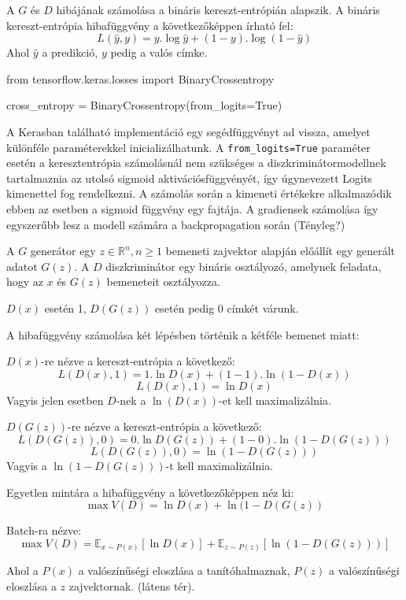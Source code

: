 
A $G$ és $D$ hibájának számolása a bináris kereszt-entrópián alapszik.
A bináris kereszt-entrópia hibafüggvény a következőképpen írható fel:
$$L(\hat y, y) = y . \log \hat y + (1-y). \log (1 - \hat y)$$
Ahol $\hat y$ a predikció, $y$ pedig a valós címke.

\begin{python}
from tensorflow.keras.losses import BinaryCrossentropy

cross_entropy = BinaryCrossentropy(from_logits=True)
\end{python}


A Kerasban található implementáció egy segédfüggvényt ad vissza, amelyet különféle paraméterekkel inicializálhatunk. A \texttt{from\_logits=True} paraméter esetén a keresztentrópia számolásnál nem szükséges a diszkriminátormodellnek tartalmaznia az utolsó sigmoid aktivációsfüggvényét, így úgynevezett Logits kimenettel fog rendelkezni. A számolás során a kimeneti értékekre alkalmazódik ebben az esetben a sigmoid függvény egy fajtája. A gradiensek számolása így egyszerűbb lesz a modell számára a backpropagation során (Tényleg?)


A $G$ generátor egy $z \in \mathbb{R}^n, n \geq 1$ bemeneti zajvektor alapján előállít egy generált adatot $G(z)$.
A $D$ diszkriminátor egy bináris osztályozó, amelynek feladata, hogy az $x$ és $G(z)$ bemeneteit osztályozza.

$D(x)$ esetén 1, $D(G(z))$ esetén pedig 0 címkét várunk.

A hibafüggvény számolása két lépésben történik a kétféle bemenet miatt:

$D(x)$-re nézve a kereszt-entrópia a következő:
$$L(D(x), 1) = 1.\ln D(x) + (1 - 1).\ln(1 - D(x))$$
$$L(D(x), 1) = \ln D(x)$$
Vagyis jelen esetben $D$-nek a $\ln(D(x))$-et kell maximalizálnia.

$D(G(z))$-re nézve a kereszt-entrópia a következő:
$$L(D(G(z)), 0) = 0.\ln D(G(z)) + (1 - 0).\ln(1 - D(G(z)))$$
$$L(D(G(z)), 0) = \ln(1- D(G(z)))$$
Vagyis a $\ln(1 - D(G(z)))$-t kell maximalizálnia.

Egyetlen mintára a hibafüggvény a következőképpen néz ki:
$$\max V(D) = \ln D(x) + \ln(1 - D(G(z))$$

Batch-ra nézve:
$$\max V(D) = \mathbb{E}_{x \sim P(x)} \left[\ln D(x) \right] + \mathbb{E}_{z \sim P(z)} \left[\ln(1 - D(G(z))) \right]$$

Ahol a $P(x)$ a valószínűségi eloszlása a tanítóhalmaznak, $P(z)$ a valószínűségi eloszlása a $z$ zajvektornak. (látens tér).

